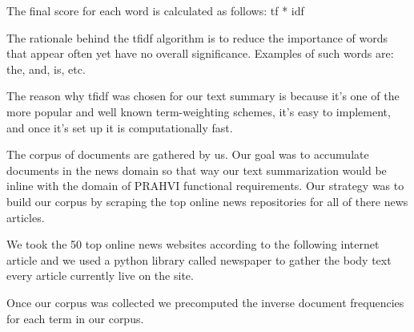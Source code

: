 The final score for each word is calculated as follows: tf * idf

The rationale behind the tfidf algorithm is to reduce the importance of words that appear often yet have no overall significance. Examples of such words are: the, and, is, etc.

The reason why tfidf was chosen for our text summary is because it's one of the more popular and well known term-weighting schemes, it's easy to implement, and once it's set up it is computationally fast.

The corpus of documents are gathered by us. Our goal was to accumulate documents in the news domain so that way our text summarization would be inline with the domain of PRAHVI functional requirements. Our strategy was to build our corpus by scraping the top online news repositories for all of there news articles. 

We took the 50 top online news websites according to the following internet article and we used a python library called newspaper to gather the body text every article currently live on the site.

Once our corpus was collected we precomputed the inverse document frequencies for each term in our corpus.